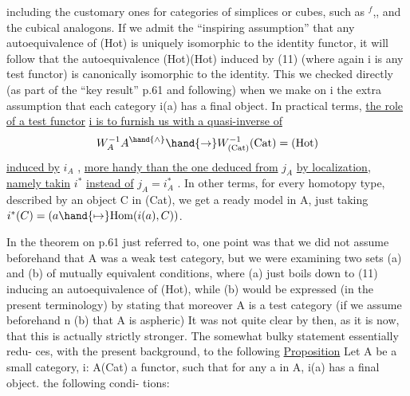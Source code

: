 including the customary ones for categories of simplices or cubes,  such as
\hand{\ensuremath{\Delta}}$^{f}$,\hand{\ensuremath{\Delta}},\hand{\ensuremath{\widetilde{\Delta}}}  and the cubical analogons.  If we admit the ``inspiring assumption''
that any autoequivalence of (Hot) is uniquely isomorphic to the identity
functor,  it will follow that the autoequivalence  (Hot)\hand{\ensuremath{\longrightarrow}}(Hot)  induced
by (11)  (where again i is any  test functor)  is canonically isomorphic to
the identity.  This we checked directly (as part of the ``key result'' p.61
and following)  when we make on i the extra assumption that each category
i(a) has a final object.  In practical terms,  \uline{the role of a  test functor}
\uline{i is to furnish us with a quasi-inverse of}
\[ W_{A}^{-1}A^{\hand{\wedge}} \hand{\ensuremath{\to}} W_{(\mathrm{Cat})}^{-1}(\mathrm{Cat}) = (\mathrm{Hot}) \]
\uline{induced by} $i_{A}$ ,  \uline{more handy than the one deduced from} $j_{A}$ \uline{by localization},
\uline{namely takin} $i^{*}$  \uline{instead of} $j_{A} = i_{A}^{*}$ .  In other terms,  for every homotopy
type,  described by an object C in (Cat),  we get a ready model in A\hand{\ensuremath{^{\wedge}}},  just
taking  $i^{*}(C) = (a\hand{\ensuremath{\mapsto}}\mathrm{Hom}(i(a),C))$.

In the theorem on p.61  just referred to,  one point was that we did
not assume beforehand that A was a weak test category,  but we were examining
two sets (a) and (b) of mutually equivalent conditions,  where  (a)  just
boils down to  (11)  inducing an autoequivalence of (Hot),  while (b)
would be expressed (in the present terminology) by stating that 
moreover A is a test category  (if we assume beforehand n  (b) that A is
aspheric)\hand{,}  It was not quite clear by then,  as it is now,  that this is
actually strictly stronger.  The somewhat bulky statement essentially redu-%
ces,  with the present background,  to the following
\uline{Proposition}   Let A be a small category,  i: A\hand{\ensuremath{\to}}(Cat)  a functor,  such
that for any  a in A,  i(a)  has a final object.    the following condi-%
tions\hand{:}:


